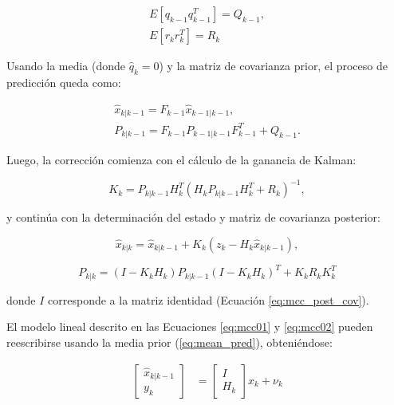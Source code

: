 \begin{equation}
\begin{gathered}
E[q_{k-1}q_{k-1}^T] = Q_{k-1}, \\
E[r_{k}r_{k}^T] = R_{k}
\end{gathered}
\end{equation}

Usando la media (donde $\hat{q}_k=0$) y la matriz de covarianza prior, el proceso de predicci\'on queda como: 

\begin{equation}
\begin{gathered}
\hat{x}_{k|k-1} = F_{k-1}\hat{x}_{k-1|k-1},\\
P_{k|k-1} = F_{k-1}P_{k-1|k-1}F_{k-1}^T + Q_{k-1}.
\end{gathered}
\label{eq:mean_pred}
\end{equation}


Luego, la correcci\'on comienza con el c\'alculo de la ganancia de Kalman:

\begin{equation}
K_k = P_{k|k-1} H_k^T (H_kP_{k|k-1}H_k^T + R_k)^{-1},
\label{eq:mcc_kalman_gain}
\end{equation}

y contin\'ua con la determinaci\'on del estado y matriz de covarianza posterior:

\begin{equation}
\hat{x}_{k|k} = \hat{x}_{k|k-1} + K_k(z_k - H_k \hat{x}_{k|k-1}),
\label{eq:mcc_post_state}
\end{equation}

\begin{equation}
P_{k|k} = (I - K_kH_k)P_{k|k-1} (I - K_kH_k)^T + K_kR_kK_k^T
\label{eq:mcc_post_cov}
\end{equation}

donde $I$ corresponde a la matriz identidad (Ecuaci\'on \ref{eq:mcc_post_cov}).
\bigskip

El modelo lineal descrito en las Ecuaciones \ref{eq:mcc01} y \ref{eq:mcc02} pueden reescribirse usando la media prior (\ref{eq:mean_pred}), obteni\'endose:


  \begin{align}
    \begin{bmatrix}
    \hat{x}_{k|k-1}\\
    y_k
	\end{bmatrix}     &= \begin{bmatrix}
          I \\
           H_{k}
         \end{bmatrix} x_k + \nu_k
         \label{eq:nu_det01}
  \end{align} 

